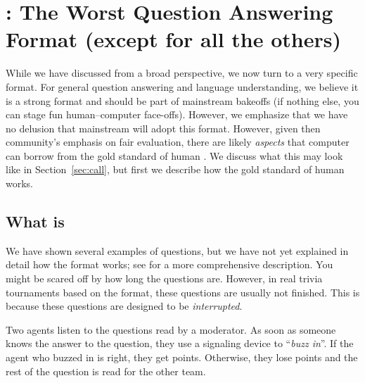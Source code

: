 

\section{\qb{}: The Worst Question Answering Format (except for all the others)}
\label{sec:qb}

While we have discussed \qa{} from a broad perspective, we now turn to a very specific format.
For general question answering and language understanding, we believe it is a strong format and should be part of mainstream  bakeoffs (if nothing else, you can stage fun human--computer face-offs).
However, we emphasize that we have no delusion that mainstream  will adopt this format.
However, given then community's emphasis on fair evaluation, there are likely \emph{aspects} that computer  can borrow from the gold standard of human .
We discuss what this may look like in Section~\ref{sec:call}, but first we describe how the gold standard of human  works.

\subsection{What is \qb{}}

We have shown several examples of \qb{} questions, but we have not yet explained in detail how the format works; see  for a more comprehensive description.
You might be scared off by how long the questions are.
However, in real trivia tournaments based on the \qb{} format, these questions are usually not finished.
This is because these questions are designed to be \emph{interrupted}.

Two agents listen to the questions read by a moderator.
As soon as someone knows the answer to the question, they use a signaling device to ``\emph{buzz in}''. 
If the agent who buzzed in is right, they get points.
Otherwise, they lose points and the rest of the question is read for the other team.  

